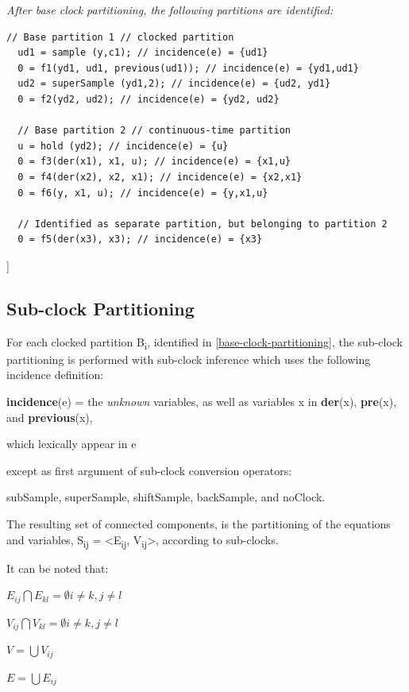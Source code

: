 \documentclass[10pt,a4paper]{report}
\def\doublelabel#1{\label{#1}}
\begin{document}
\emph{After base clock partitioning, the following partitions are
identified:}

\begin{lstlisting}[language=modelica]
  // Base partition 1 // clocked partition
  ud1 = sample (y,c1); // incidence(e) = {ud1}
  0 = f1(yd1, ud1, previous(ud1)); // incidence(e) = {yd1,ud1}
  ud2 = superSample (yd1,2); // incidence(e) = {ud2, yd1}
  0 = f2(yd2, ud2); // incidence(e) = {yd2, ud2}
  
  // Base partition 2 // continuous-time partition
  u = hold (yd2); // incidence(e) = {u}
  0 = f3(der(x1), x1, u); // incidence(e) = {x1,u}
  0 = f4(der(x2), x2, x1); // incidence(e) = {x2,x1}
  0 = f6(y, x1, u); // incidence(e) = {y,x1,u}
  
  // Identified as separate partition, but belonging to partition 2
  0 = f5(der(x3), x3); // incidence(e) = {x3}
\end{lstlisting}
{]}

\subsection{Sub-clock Partitioning}\doublelabel{sub-clock-partitioning}

For each clocked partition B\textsubscript{i}, identified in 
\ref{base-clock-partitioning}, the sub-clock partitioning is performed with sub-clock inference
which uses the following incidence definition:

\textbf{incidence}(e) = the \emph{unknown} variables, as well as
variables x in \textbf{der}(x), \textbf{pre}(x), and
\textbf{previous}(x),

which lexically appear in e

except as first argument of sub-clock conversion operators:

subSample, superSample, shiftSample, backSample, and noClock.

The resulting set of connected components, is the partitioning of the
equations and variables, S\textsubscript{ij} =
\textless{}E\textsubscript{ij}, V\textsubscript{ij}\textgreater{},
according to sub-clocks.

It can be noted that:

$E_{ij} \bigcap E_{kl} = $$\emptyset i\ne{}k, j\ne{}l$

$ V_{ij} \bigcap V_{kl} = $$\emptyset i\ne{}k, j\ne{}l$

$V = \bigcup V_{ij}$

$E = \bigcup E_{ij}$
\end{document}
